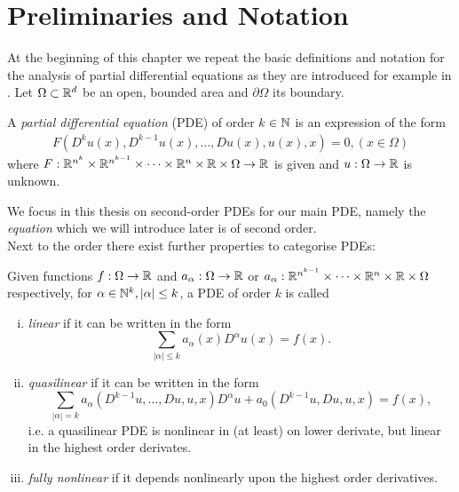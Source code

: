 \section{ Preliminaries and Notation}
At the beginning of this chapter we repeat the basic definitions and notation for the analysis of partial differential equations as they are introduced for example in \cite[Introduction]{Evans1998}.
Let $\Omega \subset \mathbb{R}^d $ be an open, bounded area and $\partial \Omega$ its boundary.
\begin{definition}
 A \emph{partial differential equation} (PDE) of order $k\in \mathbb{N}$ is an expression of the form
\begin{align}
	F(D^k u(x), D^{k-1}u(x), \dots, Du(x), u(x), x) = 0, (x \in \Omega)\label{eq:general PDE}
\end{align}
where $F:\mathbb{R}^{n^k} \times \mathbb{R}^{n^{k-1}} \times \dots \times \mathbb{R}^n \times \mathbb{R} \times \Omega \rightarrow \mathbb{R} $ is given and $u:\Omega \rightarrow \mathbb{R}$ is unknown.
\end{definition}
We focus in this thesis on second-order PDEs for our main PDE, namely the \emph{\MA equation} which we will introduce later is of second order. 
\\Next to the order there exist further properties to categorise PDEs:
\begin{definition}
	Given functions  $f:\Omega \rightarrow \mathbb{R}$ and $a_{\alpha}:\Omega \rightarrow \mathbb{R}$ or $a_{\alpha}:\mathbb{R}^{n^{k-1}} \times \dots \times \mathbb{R}^n \times \mathbb{R} \times \Omega$ respectively, for $\alpha \in \mathbb{N}^{k}, |\alpha| \leq k$, a PDE of order $k$ is called
	\begin{enumerate}[(i)]
		\item \emph{linear} if it can be written in the form
		\[
			\sum_{|\alpha| \leq k} a_{\alpha} (x) D^{\alpha} u(x) = f(x).
		\] 
		
		
		\item \emph{quasilinear} if it can be written in the form
		\[
			\sum_{|\alpha| = k} a_{\alpha}(D^{k-1}u, \dots, Du, u, x) D^{\alpha} u + a_0(D^{k-1}u, Du, u, x)= f(x),
		\]	
		i.e. a quasilinear PDE is nonlinear in (at least) on lower derivate, but linear in the highest order derivates.
		
		\item \emph{fully nonlinear} if it depends nonlinearly upon the highest order derivatives.
	\end{enumerate}
\end{definition}

